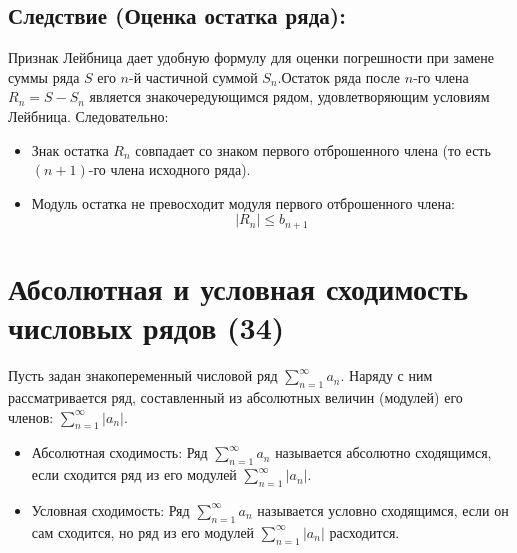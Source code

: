 \documentclass[14pt]{extreport}
\begin{document}
    \section{Следствие (Оценка остатка ряда):}

    Признак Лейбница дает удобную формулу для оценки погрешности при замене суммы ряда $S$ его $n$-й частичной суммой $S_n$.Остаток ряда после $n$-го члена $R_n = S - S_n$ является знакочередующимся рядом, удовлетворяющим условиям Лейбница. Следовательно:

    \begin{itemize}
        \item Знак остатка $R_n$ совпадает со знаком первого отброшенного члена (то есть $(n+1)$-го члена исходного ряда).
        \item Модуль остатка не превосходит модуля первого отброшенного члена:$$|R_n| \le b_{n+1}$$
    \end{itemize}

    \chapter{Абсолютная и условная сходимость числовых рядов (34)}

    \begin{definition}
        Пусть задан знакопеременный числовой ряд $\sum_{n=1}^{\infty} a_n$. Наряду с ним рассматривается ряд, составленный из абсолютных величин (модулей) его членов: $\sum_{n=1}^{\infty} |a_n|$.

        \begin{itemize}
            \item Абсолютная сходимость: Ряд $\sum_{n=1}^{\infty} a_n$ называется абсолютно сходящимся, если сходится ряд из его модулей $\sum_{n=1}^{\infty} |a_n|$.
            \item Условная сходимость: Ряд $\sum_{n=1}^{\infty} a_n$ называется условно сходящимся, если он сам сходится, но ряд из его модулей $\sum_{n=1}^{\infty} |a_n|$ расходится.
        \end{itemize}
    \end{definition}
\end{document}
